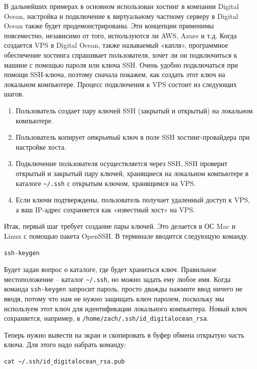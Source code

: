 \documentclass[a4paper,12pt,final,openany]{extbook}
\providecommand{\tightlist}{%
  \setlength{\itemsep}{0pt}\setlength{\parskip}{0pt}}
\begin{document}
В дальнейших примерах в основном использован хостинг в компании Digital
Ocean, настройка и подключение к виртуальному частному серверу в Digital
Ocean также будет продемонстрированы. Эти концепции применимы
повсеместно, независимо от того, используются ли AWS, Azure и т.д. Когда
создается VPS в Digital Ocean, также называемый «капля», программное
обеспечение хостинга спрашивает пользователя, хочет ли он подключиться к
машине с помощью пароля или ключа SSH. Очень удобно подключаться при
помощи SSH-ключа, поэтому сначала покажем, как создать этот ключ на локальном компьютере. Процесс подключения к VPS состоит из следующих
шагов.
\begin{enumerate}
\tightlist
\item
  Пользователь создает пару ключей SSH (закрытый и открытый) на
  локальном компьютере.
\item
  Пользователь копирует \emph{открытый} ключ в поле SSH
  хостинг-провайдера при настройке хоста.
\item
  Подключение пользователя осуществляется через SSH, SSH проверит
  открытый и закрытый пару ключей, хранящиеся на локальном компьютере в   каталоге \texttt{\textasciitilde{}/.ssh} с открытым ключом, хранящимся
  на VPS.
\item
  Если ключи подтверждены, пользователь получает удаленный доступ к VPS,
  а ваш IP-адрес сохраняется как «известный хост» на VPS.
\end{enumerate}

Итак, первый шаг требует создание пары ключей. Это делается в ОС Mac и
Linux с помощью пакета OpenSSH. В терминале вводится следующую команду.
\begin{verbatim}
ssh-keygen
\end{verbatim}

Будет задан вопрос о каталоге, где будет храниться ключ. Правильное
местоположение -- каталог \texttt{\textasciitilde{}/.ssh}, но можно
задать ему любое имя. Когда команда \texttt{ssh-keygen} запросит пароль, просто
дважды нажмите ввод ничего не вводя, потому что нам не нужно защищать
ключ паролем, поскольку мы используем этот ключ для идентификации
локального компьютера. Новый ключ сохраняется, например, в
\texttt{/home/zach/.ssh/id\_digitalocean\_rsa}.

Теперь нужно вывести на экран и скопировать в буфер обмена открытую
часть ключа. Для этого надо набрать команду:
\begin{verbatim}
cat ~/.ssh/id_digitalocean_rsa.pub
\end{verbatim}
\end{document}
